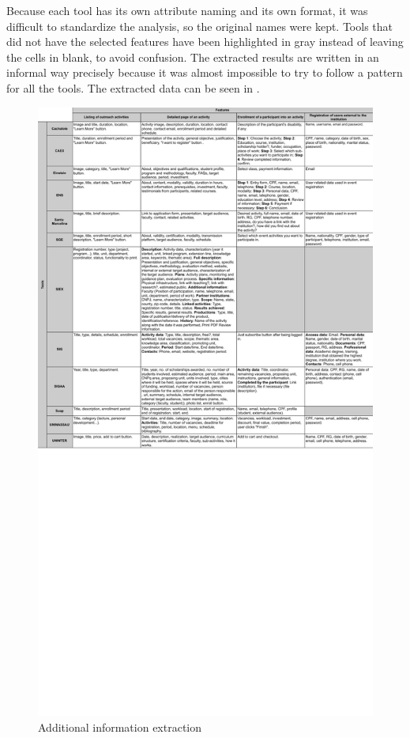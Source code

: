 Because each tool has its own attribute naming and its own format, it was difficult to standardize the analysis, so the original names were kept. Tools that did not have the selected features have been highlighted in gray instead of leaving the cells in blank, to avoid confusion. The extracted results are written in an informal way precisely because it was almost impossible to try to follow a pattern for all the tools. The extracted data can be seen in .

\begin{figure}[htb]
  \caption{Additional information extraction}\label{fig:gl-additional-extraction}
  \begin{center}
    \includegraphics[width=16cm]{img/gl-data-extraction-2.pdf}
  \end{center}
\end{figure}

